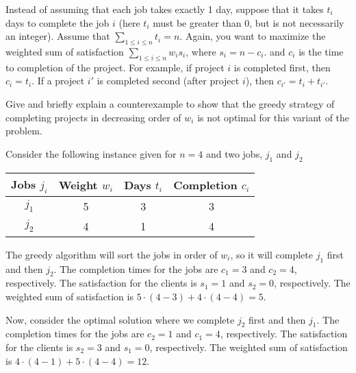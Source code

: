 \documentclass[11pt,fleqn]{exam}
\newenvironment{soln}{\color{solnblue}}{}
\newif\ifsolutions\solutionsfalse
\begin{document}
\begin{questions}
    \question[3] Instead of assuming that each job takes exactly 1 day, suppose that it takes $t_i$ days to complete the job $i$ (here $t_i$ must be greater than 0, but is not necessarily an integer). Assume that $\sum_{1 \leq i \leq n}t_i = n$. Again, you want to maximize the weighted sum of satisfaction $\sum_{1 \leq i \leq n} w_i s_i$, where $s_i = n-c_i$. and $c_i$ is the time to completion of the project. For example, if project $i$ is completed first, then $c_i = t_i$. If a project $i'$ is completed second (after project $i$), then $c_{i'} =t_i + t_{i'}$.
	
	Give and briefly explain a counterexample to show that the greedy strategy of completing projects in decreasing order of $w_i$ is not optimal for this variant of the problem.

    \begin{soln}
        Consider the following instance given for $n = 4$ and two jobs, $j_1$ and $j_2$ 
        \begin{center}
            \begin{tabular}{|c|c|c|c|}
                \hline
                Jobs $j_i$ & Weight $w_i$ & Days $t_i$ & Completion $c_i$ \\
                \hline
                $j_1$ & 5 & 3 & 3 \\
                $j_2$ & 4 & 1 & 4 \\
                \hline
            \end{tabular}
        \end{center}
        The greedy algorithm will sort the jobs in order of $w_i$, so it will complete $j_1$ first and then $j_2$. 
        The completion times for the jobs are $c_1 = 3$ and $c_2 = 4$, respectively. 
        The satisfaction for the clients is $s_1 = 1$ and $s_2 = 0$, respectively. 
        The weighted sum of satisfaction is $5 \cdot (4 - 3) + 4 \cdot (4 - 4) = 5$.

        Now, consider the optimal solution where we complete $j_2$ first and then $j_1$.
        The completion times for the jobs are $c_2 = 1$ and $c_1 = 4$, respectively.
        The satisfaction for the clients is $s_2 = 3$ and $s_1 = 0$, respectively.
        The weighted sum of satisfaction is $4 \cdot (4 - 1) + 5 \cdot (4 - 4) = 12$.

    \end{soln}

    \ifsolutions  \fi


\end{questions}
\end{document}
